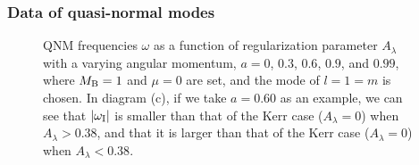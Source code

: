 \documentclass[12pt]{article}
\begin{document}
\subsubsection{Data of quasi-normal modes}
\begin{figure}[t]
\centering
\caption{QNM frequencies $\omega$ as a function of regularization parameter $A_\lambda$ with a varying angular momentum, $a=0$, $0.3$, $0.6$, $0.9$, and $0.99$, where $M_{\rm B}=1$ and $\mu=0$ are set, and the mode of  $l=1=m$ is chosen. In diagram (c), if we take $a=0.60$ as an example, we can see that  $|\omega_{\rm I}|$ is smaller than that of the Kerr case ($A_\lambda=0$) when $A_\lambda>0.38$, and that it is larger than that of the Kerr case ($A_\lambda=0$) when $A_\lambda<0.38$.}
\label{fig:QNM-A-a}
    \end{figure}
\end{document}
